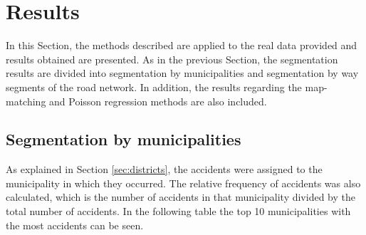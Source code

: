 \chapter{Results} \label{ch:results}
In this Section, the methods described are applied to the real data provided and results obtained are presented. As in the previous Section, the segmentation results are divided into segmentation by municipalities and segmentation by way segments of the road network. In addition, the results regarding the map-matching and Poisson regression methods are also included.

\section{Segmentation by municipalities}\label{results:municipalities}
As explained in Section \ref{sec:districts}, the accidents were assigned to the municipality in which they occurred. The relative frequency of accidents was also calculated, which is the number of accidents in that municipality divided by the total number of accidents. In the following table the top 10 municipalities with the most accidents can be seen.
